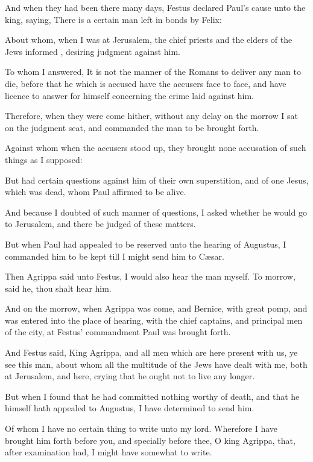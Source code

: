 {And
when they had
been
there
many
days,
Festus
declared
Paul’s
cause unto the
king,
saying, There
is a
certain
man
left in
bonds
by
Felix:

About
whom, when
I
was
at
Jerusalem, the chief
priests
and the
elders of the
Jews
informed
{},
desiring
{}
judgment
against
him.

To
whom I
answered, It
is
not the
manner of the
Romans to
deliver
any
man
to
die,
before
that he
which is
accused
have the
accusers
face
to
face,
and
have
licence to answer for
himself
concerning the crime laid against
him.

Therefore, when
they were
come
hither,
without any
delay on the
morrow I
sat
on the judgment
seat, and
commanded the
man to be brought
forth.

Against
whom when the
accusers stood
up, they
brought
none
accusation of such
things as
I
supposed:

But
had
certain
questions
against
him
of their
own
superstition,
and
of
one
Jesus, which was
dead,
whom
Paul
affirmed to be
alive.

And
because
I
doubted
of
such
manner of
questions, I
asked
{}
whether he
would
go
to
Jerusalem, and
there be
judged
of these
matters.

But when
Paul had
appealed to be
reserved
unto the
hearing of
Augustus, I
commanded
him to be
kept
till I might
send
him
to
Cæsar.

Then
Agrippa
said
unto
Festus, I
would
also
hear the
man
myself. To
morrow, said
he, thou shalt
hear
him.


\par }{\PP {}And on the
morrow, when
Agrippa was
come,
and
Bernice,
with
great
pomp,
and was
entered
into the place of
hearing,
with the chief
captains,
and
principal
men of the
city,
at
Festus’
commandment
Paul was brought
forth.

And
Festus
said,
King
Agrippa,
and all
men
which are here
present with
us, ye
see
this
man,
about
whom
all the
multitude of the
Jews have
dealt with
me,
both
at
Jerusalem,
and
{}
here, crying
that
he
ought
not to
live any
longer.

But when
I
found that
he had
committed
nothing
worthy of
death,
and that
he
himself hath appealed
to
Augustus, I have
determined to
send
him.

Of
whom I
have
no
certain
thing to
write unto my
lord.
Wherefore I have
brought
him
forth
before
you,
and
specially
before
thee, O
king
Agrippa,
that, after
examination
had, I might
have
somewhat to
write.

}
